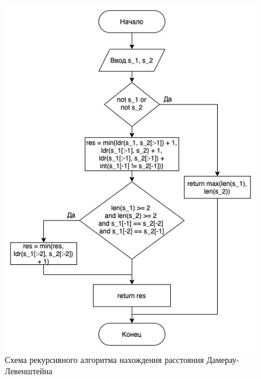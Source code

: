 \documentclass[12pt, a4paper]{report}
\begin{document}
\begin{figure}[h]
\centering
\includegraphics[width=0.9\linewidth]{ldr.jpg}
\caption{Схема рекурсивного алгоритма нахождения расстояния Дамерау-Левенштейна}
\label{fig:mpr}
\end{figure}
\end{document}
